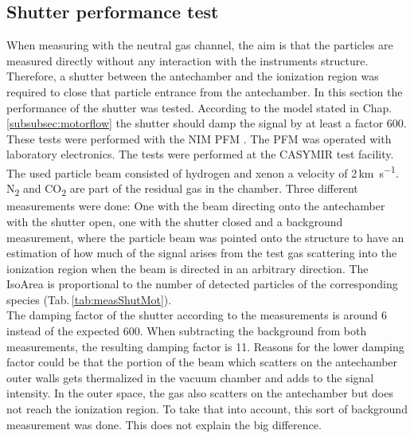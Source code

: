 	\subsection{Shutter performance test} %
	When measuring with the neutral gas channel, the aim is that the particles are measured directly without any interaction with the instruments structure. Therefore, a shutter between the antechamber and the ionization region was required to close that particle entrance from the antechamber. In this section the performance of the shutter was tested. According to the model stated in Chap.\ref{subsubsec:motorflow} the shutter should damp the signal by at least a factor 600.\\
	These tests were performed with the NIM PFM . The PFM was operated with laboratory electronics. The tests were performed at the CASYMIR test facility. The used particle beam consisted of hydrogen and xenon a velocity of 2\,\si{\kilo\meter\per\second}. N\textsubscript{2} and CO\textsubscript{2} are part of the residual gas in the chamber. Three different measurements were done: One with the beam directing onto the antechamber with the shutter open, one with the shutter closed and a background measurement, where the particle beam was pointed onto the structure to have an estimation of how much of the signal arises from the test gas scattering into the ionization region when the beam is directed in an arbitrary direction. %
	The IsoArea is proportional to the number of detected particles of the corresponding species (Tab.\,\ref{tab:measShutMot}).\\
	The damping factor of the shutter according to the measurements is around 6 instead of the expected 600. When subtracting the background from both measurements, the resulting damping factor is 11. Reasons for the lower damping factor could be that the portion of the beam which scatters on the antechamber outer walls gets thermalized in the vacuum chamber and adds to the signal intensity. In the outer space, the gas also scatters on the antechamber but does not reach the ionization region. To take that into account, this sort of background measurement was done. This does not explain the big difference.
	
